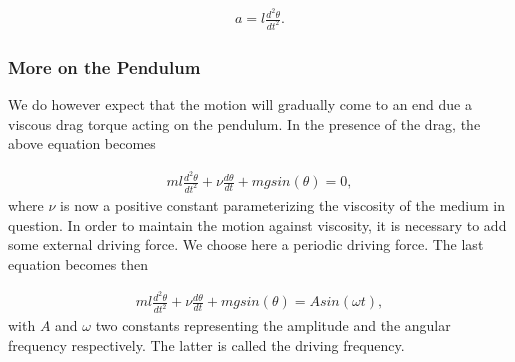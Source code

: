 \documentclass[letterpaper,10pt,english]{sphinxmanual}
\begin{document}
\begin{equation*}
\begin{split}
\begin{equation}
     a=l\frac{d^2\theta}{dt^2}.
\label{_auto21} \tag{22}
\end{equation}
\end{split}
\end{equation*}

\subsubsection{More on the Pendulum}
\label{\detokenize{chapter3:more-on-the-pendulum}}
We do however expect that the motion will gradually come to an end due a viscous drag torque acting on the pendulum.
In the presence of the drag, the above equation becomes




\begin{equation*}
\begin{split}
\begin{equation}
   ml\frac{d^2\theta}{dt^2}+\nu\frac{d\theta}{dt}  +mgsin(\theta)=0, \label{eq:pend1} \tag{23}
\end{equation}
\end{split}
\end{equation*}
where \(\nu\) is now a positive constant parameterizing the viscosity
of the medium in question. In order to maintain the motion against
viscosity, it is necessary to add some external driving force.
We choose here a periodic driving force. The last equation becomes then




\begin{equation*}
\begin{split}
\begin{equation}
   ml\frac{d^2\theta}{dt^2}+\nu\frac{d\theta}{dt}  +mgsin(\theta)=Asin(\omega t), \label{eq:pend2} \tag{24}
\end{equation}
\end{split}
\end{equation*}
with \(A\) and \(\omega\) two constants representing the amplitude and
the angular frequency respectively. The latter is called the driving frequency.
\end{document}
